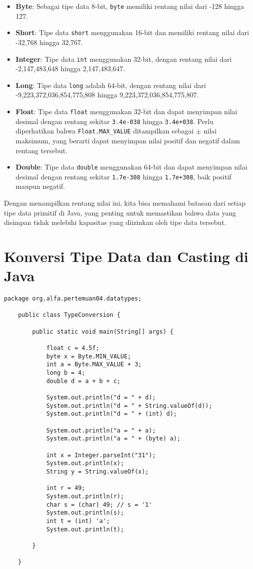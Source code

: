 \begin{itemize}
	\item \textbf{Byte}: Sebagai tipe data 8-bit, \texttt{byte} memiliki rentang nilai dari -128 hingga 127.
	\item \textbf{Short}: Tipe data \texttt{short} menggunakan 16-bit dan memiliki rentang nilai dari -32,768 hingga 32,767.
	\item \textbf{Integer}: Tipe data \texttt{int} menggunakan 32-bit, dengan rentang nilai dari -2,147,483,648 hingga 2,147,483,647.
	\item \textbf{Long}: Tipe data \texttt{long} adalah 64-bit, dengan rentang nilai dari -9,223,372,036,854,775,808 hingga 9,223,372,036,854,775,807.
	\item \textbf{Float}: Tipe data \texttt{float} menggunakan 32-bit dan dapat menyimpan nilai desimal dengan rentang sekitar \texttt{3.4e-038} hingga \texttt{3.4e+038}. Perlu diperhatikan bahwa \texttt{Float.MAX\_VALUE} ditampilkan sebagai $\pm$ nilai maksimum, yang berarti dapat menyimpan nilai positif dan negatif dalam rentang tersebut.
	\item \textbf{Double}: Tipe data \texttt{double} menggunakan 64-bit dan dapat menyimpan nilai desimal dengan rentang sekitar \texttt{1.7e-308} hingga \texttt{1.7e+308}, baik positif maupun negatif.
\end{itemize}

Dengan menampilkan rentang nilai ini, kita bisa memahami batasan dari setiap tipe data primitif di Java, yang penting untuk memastikan bahwa data yang disimpan tidak melebihi kapasitas yang diizinkan oleh tipe data tersebut.

\section{Konversi Tipe Data dan Casting di Java}

\begin{lstlisting}[style=JavaStyle, caption={Java Code for Type Conversion and Casting}]
	package org.alfa.pertemuan04.datatypes;
	
	public class TypeConversion {
		
		public static void main(String[] args) {
			
			float c = 4.5f;
			byte x = Byte.MIN_VALUE;
			int a = Byte.MAX_VALUE + 3;
			long b = 4;
			double d = a + b + c;
			
			System.out.println("d = " + d);
			System.out.println("d = " + String.valueOf(d));
			System.out.println("d = " + (int) d);
			
			System.out.println("a = " + a);
			System.out.println("a = " + (byte) a);
			
			int x = Integer.parseInt("31");
			System.out.println(x);
			String y = String.valueOf(x);
			
			int r = 49;
			System.out.println(r);
			char s = (char) 49; // s = '1' 
			System.out.println(s);
			int t = (int) 'a'; 
			System.out.println(t);
			
		}
		
	}
\end{lstlisting}

